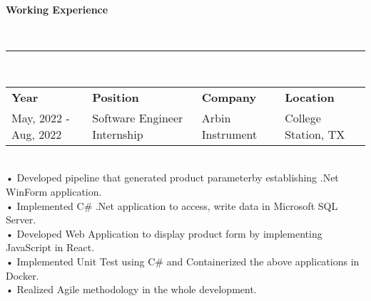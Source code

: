 \documentclass[a4paper,10pt]{article}
\newcommand{\resheading}[1]{{\small \colorbox{mygrey}{\begin{minipage}{0.975\textwidth}{\textbf{#1 \vphantom{p\^{E}}}}\end{minipage}}}}
\begin{document}
\resheading{\textbf{Working Experience} }\\
\indent \rule{6.88in}{0.4pt}\\
\indent \begin{tabular}{ l @{\hskip 0.15in} l @{\hskip 1.1in} l @{\hskip 0.15in} l @{\hskip 0.15in} }
\noindent \textbf{Year} & \textbf{Position} & \textbf{Company} & \textbf{Location}\\
May, 2022 - Aug, 2022 & Software Engineer Internship   
 & Arbin Instrument & College Station, TX\\ 
\end{tabular}
\\

\indent• Developed pipeline that generated product parameterby establishing .Net WinForm application.\\
\indent• Implemented C\# .Net application to access, write data in Microsoft SQL Server.\\
\indent• Developed Web Application to display product form by implementing JavaScript in React.\\
\indent• Implemented Unit Test using C\# and Containerized the above applications in Docker.\\
\indent• Realized Agile methodology in the whole development.
 
\end{document}
